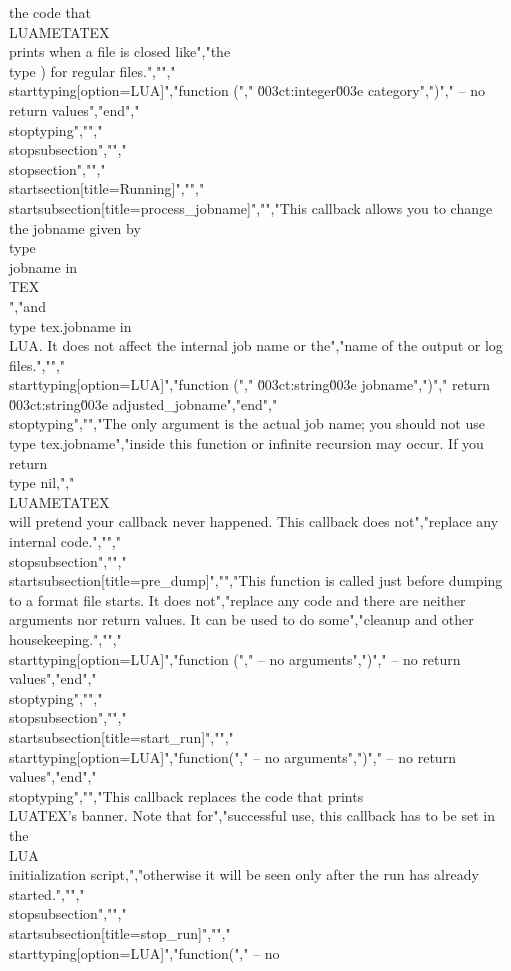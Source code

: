 the code that \\LUAMETATEX\\ prints when a file is closed like","the \\type {)} for regular files.","","\\starttyping[option=LUA]","function (","    \u003ct:integer\u003e category",")","    -- no return values","end","\\stoptyping","","\\stopsubsection","","\\stopsection","","\\startsection[title=Running]","","\\startsubsection[title=process_jobname]","","This callback allows you to change the jobname given by \\type {\\jobname} in \\TEX\\","and \\type {tex.jobname} in \\LUA. It does not affect the internal job name or the","name of the output or log files.","","\\starttyping[option=LUA]","function (","    \u003ct:string\u003e jobname",")","    return \u003ct:string\u003e adjusted_jobname","end","\\stoptyping","","The only argument is the actual job name; you should not use \\type {tex.jobname}","inside this function or infinite recursion may occur. If you return \\type {nil},","\\LUAMETATEX\\ will pretend your callback never happened. This callback does not","replace any internal code.","","\\stopsubsection","","\\startsubsection[title=pre_dump]","","This function is called just before dumping to a format file starts. It does not","replace any code and there are neither arguments nor return values. It can be used to do some","cleanup and other housekeeping.","","\\starttyping[option=LUA]","function (","    -- no arguments",")","    -- no return values","end","\\stoptyping","","\\stopsubsection","","\\startsubsection[title=start_run]","","\\starttyping[option=LUA]","function(","    -- no arguments",")","    -- no return values","end","\\stoptyping","","This callback replaces the code that prints \\LUATEX's banner. Note that for","successful use, this callback has to be set in the \\LUA\\ initialization script,","otherwise it will be seen only after the run has already started.","","\\stopsubsection","","\\startsubsection[title=stop_run]","","\\starttyping[option=LUA]","function(","    -- no 